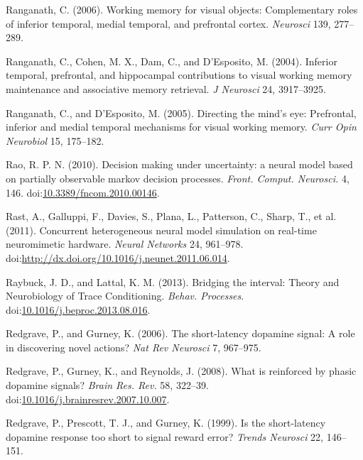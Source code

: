 \documentclass[
  11pt,
  a4paper,
]{scrbook}
\newlength{\cslhangindent}
\newenvironment{CSLReferences}[2] %
 {\begin{list}{}{%
  \setlength{\itemindent}{0pt}
  \setlength{\leftmargin}{0pt}
  \setlength{\parsep}{0pt}
  \ifodd #1
   \setlength{\leftmargin}{\cslhangindent}
   \setlength{\itemindent}{-1\cslhangindent}
  \fi
  \setlength{\itemsep}{#2\baselineskip}}}
 {\end{list}}
\begin{document}
\begin{CSLReferences}{1}{1}
Ranganath, C. (2006). Working memory for visual objects: Complementary
roles of inferior temporal, medial temporal, and prefrontal cortex.
\emph{Neurosci} 139, 277--289.

Ranganath, C., Cohen, M. X., Dam, C., and D'Esposito, M. (2004).
Inferior temporal, prefrontal, and hippocampal contributions to visual
working memory maintenance and associative memory retrieval. \emph{J
Neurosci} 24, 3917--3925.

Ranganath, C., and D'Esposito, M. (2005). Directing the mind's eye:
Prefrontal, inferior and medial temporal mechanisms for visual working
memory. \emph{Curr Opin Neurobiol} 15, 175--182.

Rao, R. P. N. (2010). {Decision making under uncertainty: a neural model
based on partially observable markov decision processes.} \emph{Front.
Comput. Neurosci.} 4, 146.
doi:\href{https://doi.org/10.3389/fncom.2010.00146}{10.3389/fncom.2010.00146}.

Rast, A., Galluppi, F., Davies, S., Plana, L., Patterson, C., Sharp, T.,
et al. (2011). Concurrent heterogeneous neural model simulation on
real-time neuromimetic hardware. \emph{Neural Networks} 24, 961--978.
doi:\url{http://dx.doi.org/10.1016/j.neunet.2011.06.014}.

Raybuck, J. D., and Lattal, K. M. (2013). {Bridging the interval: Theory
and Neurobiology of Trace Conditioning.} \emph{Behav. Processes}.
doi:\href{https://doi.org/10.1016/j.beproc.2013.08.016}{10.1016/j.beproc.2013.08.016}.

Redgrave, P., and Gurney, K. (2006). The short-latency dopamine signal:
A role in discovering novel actions? \emph{Nat Rev Neurosci} 7,
967--975.

Redgrave, P., Gurney, K., and Reynolds, J. (2008). {What is reinforced
by phasic dopamine signals?} \emph{Brain Res. Rev.} 58, 322--39.
doi:\href{https://doi.org/10.1016/j.brainresrev.2007.10.007}{10.1016/j.brainresrev.2007.10.007}.

Redgrave, P., Prescott, T. J., and Gurney, K. (1999). Is the
short-latency dopamine response too short to signal reward error?
\emph{Trends Neurosci} 22, 146--151.


\end{CSLReferences}
\end{document}
